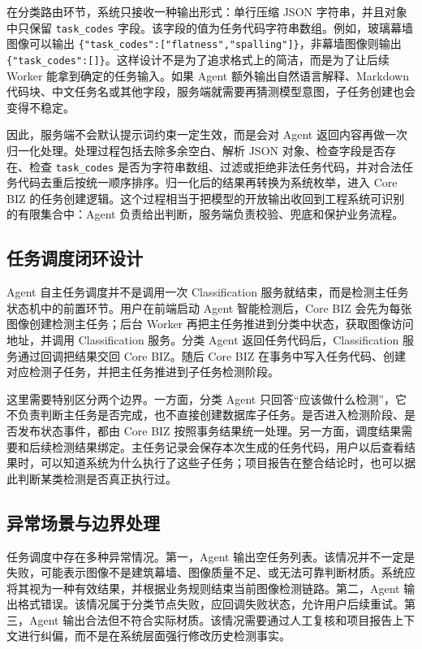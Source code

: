 在分类路由环节，系统只接收一种输出形式：单行压缩 JSON 字符串，并且对象中只保留 \texttt{task\_codes} 字段。该字段的值为任务代码字符串数组。例如，玻璃幕墙图像可以输出 \texttt{\{"task\_codes":["flatness","spalling"]\}}，非幕墙图像则输出 \texttt{\{"task\_codes":[]\}}。这样设计不是为了追求格式上的简洁，而是为了让后续 Worker 能拿到确定的任务输入。如果 Agent 额外输出自然语言解释、Markdown 代码块、中文任务名或其他字段，服务端就需要再猜测模型意图，子任务创建也会变得不稳定。

因此，服务端不会默认提示词约束一定生效，而是会对 Agent 返回内容再做一次归一化处理。处理过程包括去除多余空白、解析 JSON 对象、检查字段是否存在、检查 \texttt{task\_codes} 是否为字符串数组、过滤或拒绝非法任务代码，并对合法任务代码去重后按统一顺序排序。归一化后的结果再转换为系统枚举，进入 Core BIZ 的任务创建逻辑。这个过程相当于把模型的开放输出收回到工程系统可识别的有限集合中：Agent 负责给出判断，服务端负责校验、兜底和保护业务流程。

\subsection{任务调度闭环设计}
\label{subsec:design-task-scheduling-closed-loop}

Agent 自主任务调度并不是调用一次 Classification 服务就结束，而是检测主任务状态机中的前置环节。用户在前端启动 Agent 智能检测后，Core BIZ 会先为每张图像创建检测主任务；后台 Worker 再把主任务推进到分类中状态，获取图像访问地址，并调用 Classification 服务。分类 Agent 返回任务代码后，Classification 服务通过回调把结果交回 Core BIZ。随后 Core BIZ 在事务中写入任务代码、创建对应检测子任务，并把主任务推进到子任务检测阶段。

这里需要特别区分两个边界。一方面，分类 Agent 只回答“应该做什么检测”，它不负责判断主任务是否完成，也不直接创建数据库子任务。是否进入检测阶段、是否发布状态事件，都由 Core BIZ 按照事务结果统一处理。另一方面，调度结果需要和后续检测结果绑定。主任务记录会保存本次生成的任务代码，用户以后查看结果时，可以知道系统为什么执行了这些子任务；项目报告在整合结论时，也可以据此判断某类检测是否真正执行过。

\subsection{异常场景与边界处理}
\label{subsec:design-routing-exception-handling}

任务调度中存在多种异常情况。第一，Agent 输出空任务列表。该情况并不一定是失败，可能表示图像不是建筑幕墙、图像质量不足、或无法可靠判断材质。系统应将其视为一种有效结果，并根据业务规则结束当前图像检测链路。第二，Agent 输出格式错误。该情况属于分类节点失败，应回调失败状态，允许用户后续重试。第三，Agent 输出合法但不符合实际材质。该情况需要通过人工复核和项目报告上下文进行纠偏，而不是在系统层面强行修改历史检测事实。

